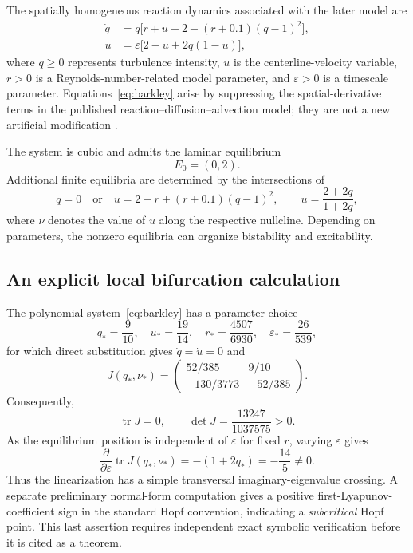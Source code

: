 \documentclass[11pt,a4paper]{article}
\begin{document}
The spatially homogeneous reaction dynamics associated with the later model are
\begin{equation}
\boxed{\begin{aligned}
\dot q &=q\bigl[r+u-2-(r+0.1)(q-1)^2\bigr],\\
\dot u &=\varepsilon\bigl[2-u+2q(1-u)\bigr],
\end{aligned}}
\label{eq:barkley}
\end{equation}
where $q\ge0$ represents turbulence intensity, $u$ is the centerline-velocity variable, $r>0$ is a Reynolds-number-related model parameter, and $\varepsilon>0$ is a timescale parameter. Equations~\eqref{eq:barkley} arise by suppressing the spatial-derivative terms in the published reaction--diffusion--advection model; they are not a new artificial modification \cite{BarkleyEtAl2015,KuehnSedlmeier2025}.

The system is cubic and admits the laminar equilibrium
\[
E_0=(0,2).
\]
Additional finite equilibria are determined by the intersections of
\[
q=0\quad\text{or}\quad
u=2-r+(r+0.1)(q-1)^2,
\qquad
u=\frac{2+2q}{1+2q},
\]
where $\nu$ denotes the value of $u$ along the respective nullcline. Depending on parameters, the nonzero equilibria can organize bistability and excitability.

\subsection{An explicit local bifurcation calculation}

The polynomial system~\eqref{eq:barkley} has a parameter choice
\begin{equation}
q_* = \frac{9}{10},\quad
u_* = \frac{19}{14},\quad
r_* = \frac{4507}{6930},\quad
\varepsilon_* = \frac{26}{539},
\label{eq:barkley-values}
\end{equation}
for which direct substitution gives $\dot q=\dot u=0$ and
\begin{equation}
J(q_*,\nu_*)=
\begin{pmatrix}
 52/385 & 9/10\\
 -130/3773 & -52/385
\end{pmatrix}.
\label{eq:barkley-J}
\end{equation}
Consequently,
\[
\operatorname{tr}J=0,\qquad
\det J=\frac{13247}{1037575}>0.
\]
As the equilibrium position is independent of $\varepsilon$ for fixed $r$, varying $\varepsilon$ gives
\begin{equation}
\frac{\partial}{\partial\varepsilon}
\operatorname{tr}J(q_*,\nu_*)
=-(1+2q_*)=-\frac{14}{5}\ne0.
\end{equation}
Thus the linearization has a simple transversal imaginary-eigenvalue crossing. A separate preliminary normal-form computation gives a positive first-Lyapunov-coefficient sign in the standard Hopf convention, indicating a \emph{subcritical} Hopf point. This last assertion requires independent exact symbolic verification before it is cited as a theorem.
\end{document}
